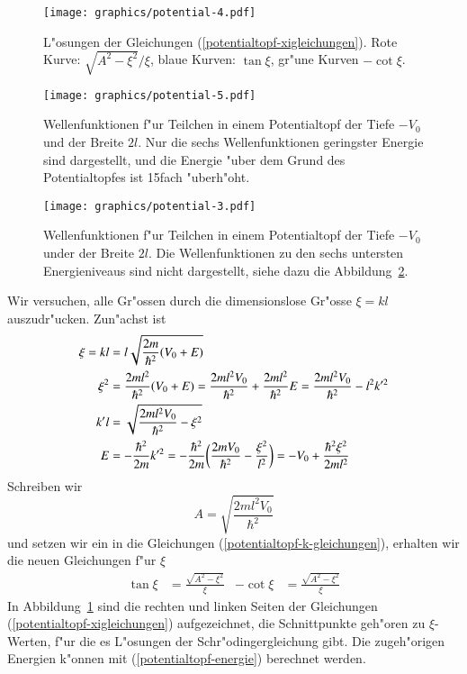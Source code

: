 \begin{figure}
\centering
\texttt{[image: graphics/potential-4.pdf]}
\caption{L"osungen der Gleichungen (\ref{potentialtopf-xigleichungen}).
Rote Kurve: $\sqrt{A^2-\xi^2}/\xi$, blaue Kurven: $\tan\xi$, gr"une
Kurven $-\cot\xi$.
\label{loesungen-xigleichungen}}
\end{figure}%
\begin{figure}
\centering
\texttt{[image: graphics/potential-5.pdf]}
\caption{Wellenfunktionen f"ur Teilchen in einem Potentialtopf der
Tiefe $-V_0$ und der Breite $2l$. Nur die sechs Wellenfunktionen 
geringster Energie sind dargestellt, und die Energie "uber dem
Grund des Potentialtopfes ist 15fach "uberh"oht.
\label{potentialtopf-loesungen-klein}}
\end{figure}
\begin{figure}
\centering
\texttt{[image: graphics/potential-3.pdf]}
\caption{Wellenfunktionen f"ur Teilchen in einem Potentialtopf der
Tiefe $-V_0$ under der Breite $2l$. Die Wellenfunktionen zu den sechs
untersten Energieniveaus sind nicht dargestellt, siehe dazu die
Abbildung~\ref{potentialtopf-loesungen-klein}.
\label{potentialtopf-loesungen}}
\end{figure}
Wir versuchen, alle Gr"ossen durch die dimensionslose Gr"osse $\xi=kl$
auszudr"ucken.
Zun"achst ist
\begin{align}
\xi=kl&=l\sqrt{\frac{2m}{\hbar^2}(V_0+E)}
\notag
\\
\xi^2
&=
\frac{2ml^2}{\hbar^2}(V_0+E)
=
\frac{2ml^2V_0}{\hbar^2} +\frac{2ml^2}{\hbar^2}E
=
\frac{2ml^2V_0}{\hbar^2}-l^2k'^2
\notag
\\
k'l
&=
\sqrt{\frac{2ml^2V_0}{\hbar^2} - \xi^2}
\notag
\\
E
&=
-\frac{\hbar^2}{2m}k'^2
=
-\frac{\hbar^2}{2m}
\biggl(
\frac{2mV_0}{\hbar^2} - \frac{\xi^2}{l^2}
\biggr)
=
-V_0+\frac{\hbar^2\xi^2}{2ml^2}
\label{potentialtopf-energie}
\end{align}
Schreiben wir
\[
A=\sqrt{\frac{2ml^2V_0}{\hbar^2}}
\]
und setzen wir ein in die Gleichungen (\ref{potentialtopf-k-gleichungen}),
erhalten wir die neuen Gleichungen f"ur $\xi$
\begin{align}
\tan \xi&=\frac{\sqrt{A^2-\xi^2}}{\xi}
&
-\cot \xi&=\frac{\sqrt{A^2-\xi^2}}{\xi}
\label{potentialtopf-xigleichungen}
\end{align}
In Abbildung~\ref{loesungen-xigleichungen} sind die rechten und linken
Seiten der Gleichungen (\ref{potentialtopf-xigleichungen}) aufgezeichnet,
die Schnittpunkte geh"oren zu $\xi$-Werten, f"ur die es L"osungen
der Schr"odingergleichung gibt.
Die zugeh"origen Energien k"onnen mit (\ref{potentialtopf-energie})
berechnet werden.

